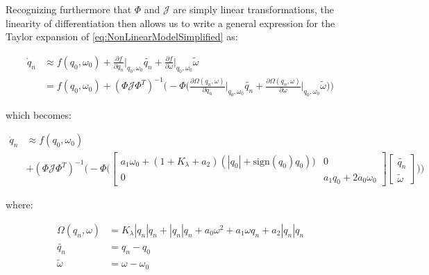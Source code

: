 Recognizing furthermore that $\Phi$ and $\mathcal{J}$ are simply linear transformations, the linearity of differentiation then allows us to write a general expression for the Taylor expansion of \cref{eq:NonLinearModelSimplified} as:

\begin{equation}\label{eq:SymbolicLinearisation}
	\begin{split}
		\dot{q}_n &\approx f(q_0,\omega_0) + \frac{\partial f}{\partial q_n}\bigg\rvert_{q_0,\omega_0} \tilde{q_n} + \frac{\partial f}{\partial \omega}\bigg\rvert_{q_0,\omega_0} \tilde{\omega} 
		\\
		&= f(q_0,\omega_0) + (\Phi\mathcal{J}\Phi^T)^{-1} \Big(-\Phi\Big( \frac{\partial \Omega(q_n,\omega)}{\partial q_n}\bigg\rvert_{q_0,\omega_0} \tilde{q_n} + \frac{\partial \Omega(q_n,\omega)}{\partial \omega}\bigg\rvert_{q_0,\omega_0} \tilde{\omega} \Big)\Big) 
	\end{split}
\end{equation}

which becomes: 

\begin{equation}\label{eq:SymbolicLinearisationExpanded}
	\begin{split}
			\dot{q}_n &\approx f(q_0,\omega_0) \\ 
			&+ (\Phi\mathcal{J}\Phi^T)^{-1} 
		\Bigg(-\Phi\Bigg( 
		\begin{bmatrix}
			a_1\omega_0 + (1 + K_\lambda + a_2) (|q_0| + \text{sign}(q_0)q_0) \Big) & 0 \\ 0 & a_1 q_0+2 a_0 \omega_0
		\end{bmatrix} 
		\begin{bmatrix}
			\tilde{q_n} \\ \tilde{\omega}
		\end{bmatrix}  \Bigg)\Bigg) 
	\end{split}
\end{equation}

where: 

\begin{align}\label{eq:SymbLinDefinitions}
	\Omega(q_n,\omega) &= K_\lambda|q_n|q_n+|q_n|q_n+a_0\omega^2+a_1\omega q_n+a_2|q_n|q_n \\
	\tilde{q_n} &= q_n - q_0 \\
	\tilde{\omega} &= \omega - \omega_0
\end{align}


